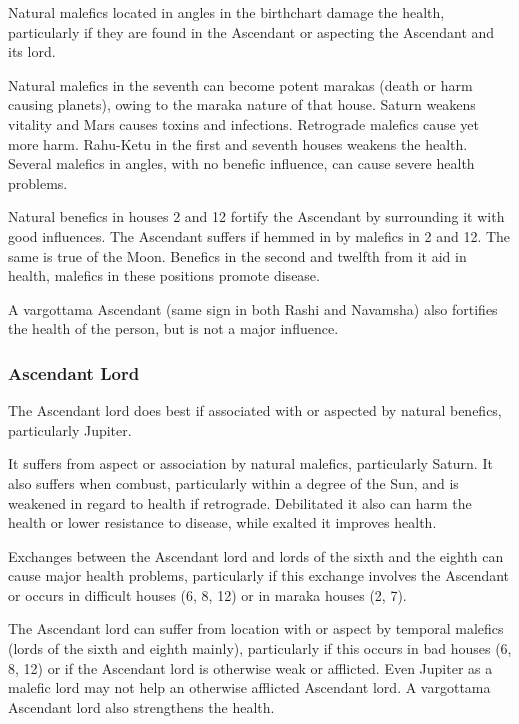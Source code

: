  

Natural malefics located in angles in the birthchart damage the health, particularly if they are found in the Ascendant or aspecting the Ascendant and its lord.
 

Natural malefics in the seventh can become potent marakas (death or harm causing planets), owing to the maraka nature of that house. Saturn weakens vitality and Mars causes toxins and infections. Retrograde malefics cause yet more harm. Rahu-Ketu in the first and seventh houses weakens the health. Several malefics in angles, with no benefic influence, can cause severe health problems.

 

Natural benefics in houses 2 and 12 fortify the Ascendant by surrounding it with good influences. The Ascendant suffers if hemmed in by malefics in 2 and 12. The same is true of the Moon. Benefics in the second and twelfth from it aid in health, malefics in these positions promote disease.

 

A vargottama Ascendant (same sign in both Rashi and Navamsha) also fortifies the health of the person, but is not a major influence.

 

\subsubsection{Ascendant Lord}

 

The Ascendant lord does best if associated with or aspected by natural benefics, particularly Jupiter.
 

It suffers from aspect or association by natural malefics, particularly Saturn. It also suffers when combust, particularly within a degree of the Sun, and is weakened in regard to health if retrograde. Debilitated it also can harm the health or lower resistance to disease, while exalted it improves health.

 

Exchanges between the Ascendant lord and lords of the sixth and the eighth can cause major health problems, particularly if this exchange involves the Ascendant or occurs in difficult houses (6, 8, 12) or in maraka houses (2, 7).

 

The Ascendant lord can suffer from location with or aspect by temporal malefics (lords of the sixth and eighth mainly), particularly if this occurs in bad houses (6, 8, 12) or if the Ascendant lord is otherwise weak or afflicted. Even Jupiter as a malefic lord may not help an otherwise afflicted Ascendant lord. A vargottama Ascendant lord also strengthens the health.

